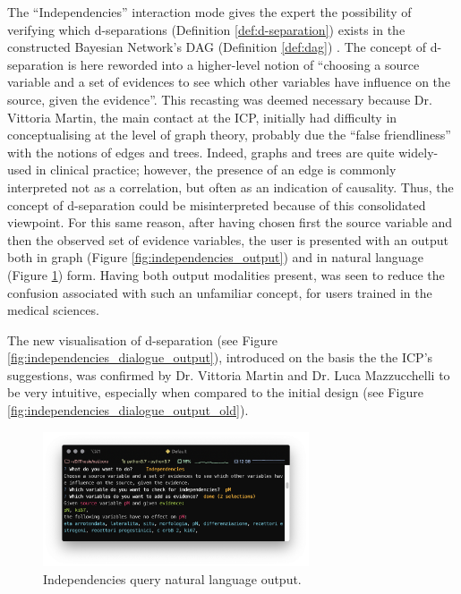 The \enquote{Independencies} interaction mode gives the expert the possibility of verifying which d-separations (Definition \ref{def:d-separation}) exists in the constructed Bayesian Network's DAG (Definition \ref{def:dag}) .
The concept of d-separation is here reworded into a higher-level notion of \enquote{choosing a source variable and a set of evidences to see which other variables have influence on the source, given the evidence}.
This recasting was deemed necessary because Dr. Vittoria Martin, the main contact at the ICP, initially had difficulty in conceptualising at the level of graph theory, probably due the \enquote{false friendliness} with the notions of edges and trees. 
Indeed, graphs and trees are quite widely-used in clinical practice; however, the presence of an edge is commonly interpreted not as a correlation, but often as an indication of causality. 
Thus, the concept of d-separation could be misinterpreted because of this consolidated viewpoint.
For this same reason, after having chosen first the source variable and then the observed set of evidence variables, the user is presented with an output both in graph (Figure \ref{fig:independencies_output}) and in natural language (Figure \ref{fig:sw_2_independencies}) form.
Having both output modalities present, was seen to reduce the confusion associated with such an unfamiliar concept, for users trained in the medical sciences.

The new visualisation of d-separation (see Figure \ref{fig:independencies_dialogue_output}), introduced on the basis the the ICP's suggestions, was confirmed by Dr. Vittoria Martin and Dr. Luca Mazzucchelli to be very intuitive, especially when compared to the initial design (see Figure \ref{fig:independencies_dialogue_output_old}).

\begin{figure}[htbp]
\centerline{\includegraphics[width=0.7\textwidth]{results/images/sw_2_independencies}}
\caption{Independencies query natural language output.}
\label{fig:sw_2_independencies}
\end{figure}

